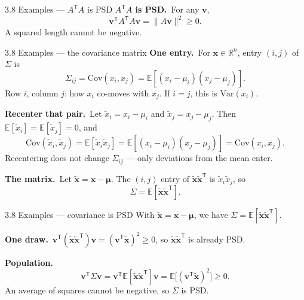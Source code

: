 \documentclass[11pt,aspectratio=169]{beamer}
\begin{document}
\begin{frame}{3.8 Examples --- $A^{\mathsf T}A$ is PSD}
  \footnotesize
  \textbf{$A^{\mathsf T}A$ is PSD.}\
  For any $\mathbf{v}$,
  \[
    \mathbf{v}^{\mathsf T}A^{\mathsf T}A\mathbf{v}=\|A\mathbf{v}\|^2\ge 0.
  \]
  A squared length cannot be negative.
\end{frame}

\begin{frame}{3.8 Examples --- the covariance matrix}
  \footnotesize
  \textbf{One entry.}\
  For $\mathbf{x}\in\mathbb{R}^n$, entry $(i,j)$ of $\Sigma$ is
  \[
    \Sigma_{ij}=\mathrm{Cov}(x_i,x_j)=\mathbb{E}[(x_i-\mu_i)(x_j-\mu_j)].
  \]
  Row $i$, column $j$: how $x_i$ co-moves with $x_j$. If $i=j$, this is $\mathrm{Var}(x_i)$.

  \medskip
  \textbf{Recenter that pair.}\
  Let $\tilde{x}_i=x_i-\mu_i$ and $\tilde{x}_j=x_j-\mu_j$. Then $\mathbb{E}[\tilde{x}_i]=\mathbb{E}[\tilde{x}_j]=0$, and
  \[
    \mathrm{Cov}(\tilde{x}_i,\tilde{x}_j)
    =\mathbb{E}[\tilde{x}_i\tilde{x}_j]
    =\mathbb{E}[(x_i-\mu_i)(x_j-\mu_j)]
    =\mathrm{Cov}(x_i,x_j).
  \]
  Recentering does not change $\Sigma_{ij}$ --- only deviations from the mean enter.

  \medskip
  \textbf{The matrix.}\
  Let $\tilde{\mathbf{x}}=\mathbf{x}-\boldsymbol{\mu}$. The $(i,j)$ entry of $\tilde{\mathbf{x}}\tilde{\mathbf{x}}^{\mathsf T}$ is $\tilde{x}_i\tilde{x}_j$, so
  \[
    \Sigma=\mathbb{E}[\tilde{\mathbf{x}}\tilde{\mathbf{x}}^{\mathsf T}].
  \]
\end{frame}

\begin{frame}{3.8 Examples --- covariance is PSD}
  \footnotesize
  With $\tilde{\mathbf{x}}=\mathbf{x}-\boldsymbol{\mu}$, we have $\Sigma=\mathbb{E}[\tilde{\mathbf{x}}\tilde{\mathbf{x}}^{\mathsf T}]$.

  \medskip
  \textbf{One draw.}\
  $\mathbf{v}^{\mathsf T}(\tilde{\mathbf{x}}\tilde{\mathbf{x}}^{\mathsf T})\mathbf{v}=(\mathbf{v}^{\mathsf T}\tilde{\mathbf{x}})^2\ge 0$,
  so $\tilde{\mathbf{x}}\tilde{\mathbf{x}}^{\mathsf T}$ is already PSD.

  \medskip
  \textbf{Population.}\
  \[
    \mathbf{v}^{\mathsf T}\Sigma\mathbf{v}
    =\mathbf{v}^{\mathsf T}\mathbb{E}[\tilde{\mathbf{x}}\tilde{\mathbf{x}}^{\mathsf T}]\mathbf{v}
    =\mathbb{E}\bigl[(\mathbf{v}^{\mathsf T}\tilde{\mathbf{x}})^2\bigr]\ge 0.
  \]
  An average of squares cannot be negative, so $\Sigma$ is PSD.
\end{frame}
\end{document}
